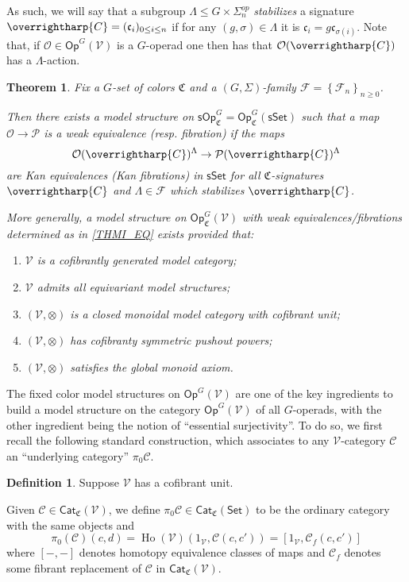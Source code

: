 \documentclass[a4paper,10pt
,draft
]{article}%
\numberwithin{equation}{section}
\numberwithin{figure}{section}
\newtheorem{theorem}[equation]{Theorem}%
\theoremstyle{definition} %
\newtheorem{definition}[equation]{Definition}%
\newcommand{\set}[1]{\left\{#1\right\}}%
\newcommand{\vect}[1]{\text{\overrightharp{\ensuremath{#1}}}}
\newcommand{\Cat}{\mathsf{Cat}}
\newcommand{\Op}{\mathsf{Op}}%
\DeclareMathOperator{\Ho}{Ho}
\newcommand{\F}{\ensuremath{\mathcal F}}
\newcommand{\V}{\ensuremath{\mathcal V}}
\renewcommand{\O}{\ensuremath{\mathcal O}}
\newcommand{\1}{\ensuremath{\mathbbm 1}}%
\begin{document}
As such, we will say that a subgroup 
$\Lambda \leq G \times \Sigma_n^{op}$
\emph{stabilizes} a signature $\vect{C}=(\mathfrak{c}_i)_{0 \leq i \leq n}$
if for any 
$(g,\sigma) \in \Lambda$ it is 
$\mathfrak{c}_i = g \mathfrak{c}_{\sigma(i)}$.
Note that, if $\O \in \mathsf{Op}^G(\V)$
is a $G$-operad one then has that
$\O(\vect{C})$ has a $\Lambda$-action.

 


\begin{theorem}\label{THMI}
Fix a $G$-set of colors $\mathfrak{C}$
and a $(G,\Sigma)$-family $\F = \set{\F_n}_{n \geq 0}$.

Then there exists a model structure on
$\mathsf{sOp}^G_{\mathfrak{C}} = 
\mathsf{Op}^G_{\mathfrak{C}}(\mathsf{sSet})$
such that a map
$\mathcal{O} \to \mathcal{P}$
is a weak equivalence (resp. fibration) if the maps
\begin{equation}\label{THMI_EQ}
	\O(\vect{C})^{\Lambda} \to \mathcal{P}(\vect{C})^{\Lambda}
\end{equation}
are Kan equivalences (Kan fibrations)
in $\mathsf{sSet}$
for all $\mathfrak{C}$-signatures $\vect{C}$
and $\Lambda \in \F$ which stabilizes $\vect{C}$.

More generally, a model structure on 
$\Op^G_{\mathfrak C}(\V)$
with weak equivalences/fibrations determined as in 
\eqref{THMI_EQ}
exists provided that:
\begin{enumerate}[label = (\roman*)]
	\item $\V$ is a cofibrantly generated model category;
	\item $\V$ admits all equivariant model structures;
	\item $(\V, \otimes)$ is a closed monoidal model category with cofibrant unit;
	\item $(\V, \otimes)$ has cofibranty symmetric pushout powers;
	\item $(\V, \otimes)$ satisfies the global monoid axiom.
\end{enumerate}
\end{theorem}


The fixed color model structures
on $\mathsf{Op}^G(\V)$
are one of the key ingredients to build a model structure
on the category 
$\mathsf{Op}^G(\V)$
of all $G$-operads,
with the other ingredient being the notion of ``essential surjectivity''.
To do so, we first recall the following standard construction, 
which associates to any $\V$-category $\mathcal{C}$
an ``underlying category'' $\pi_0 \mathcal{C}$.

\begin{definition}\label{HTPY_DEFN}
	Suppose $\V$ has a cofibrant unit.

	Given $\mathcal C \in \Cat_{\mathfrak{C}}(\V)$,
	we define $\pi_0 \mathcal C \in \Cat_{\mathfrak{C}}(\mathsf{Set})$ 
	to be the ordinary category with the same objects and
\[
	\pi_0(\mathcal{C})(c,d)=
	\Ho(\V)(1_\V, \mathcal C(c,c'))=
	[1_\V, \mathcal{C}_f(c,c')]
\]
where $[-,-]$ denotes homotopy equivalence classes of maps
and $\mathcal{C}_f$ denotes some fibrant replacement of
$\mathcal C$ in $\Cat_{\mathfrak{C}}(\V)$.
\end{definition}
\end{document}
